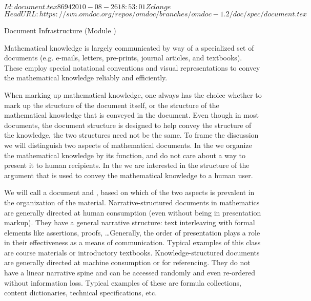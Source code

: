\svnInfo $Id: document.tex 8694 2010-08-26 18:53:01Z clange $
\svnKeyword $HeadURL: https://svn.omdoc.org/repos/omdoc/branches/omdoc-1.2/doc/spec/document.tex $

\begin{tchapter}[id=omdoc-infrastructure,short=Document Infrastructure]{Document Infrastructure (Module {})}

Mathematical knowledge is largely communicated by way of a specialized set of
documents (e.g. e-mails, letters, pre-prints, journal articles, and textbooks).
These employ special notational conventions and visual
representations to convey the mathematical knowledge reliably and efficiently.

When marking up mathematical knowledge, one always has the choice whether to mark up the
structure of the document itself, or the structure of the mathematical knowledge that is
conveyed in the document. Even though in most documents, the document structure is
designed to help convey the structure of the knowledge, the two structures need not be the
same.  To frame the discussion we will distinguish two aspects of mathematical
documents. In the {} we organize the mathematical
knowledge by its function, and do not care about a way to present it to human
recipients. In the {} we are interested in the
structure of the argument that is used to convey the mathematical knowledge to a human
user.

We will call a document {} and
{}, based on which of the
two aspects is prevalent in the organization of the material.  Narrative-structured
documents in mathematics are generally directed at human consumption (even without being
in presentation markup). They have a general narrative structure: text interleaving with
formal elements like assertions, proofs, \ldots Generally, the order of presentation plays
a role in their effectiveness as a means of communication.  Typical examples of this class
are course materials or introductory textbooks.  Knowledge-structured documents are
generally directed at machine consumption or for referencing. They do not have a linear
narrative spine and can be accessed randomly and even re-ordered without information loss.
Typical examples of these are formula collections, {\openmath} content dictionaries,
technical specifications, etc.


\end{tchapter}
